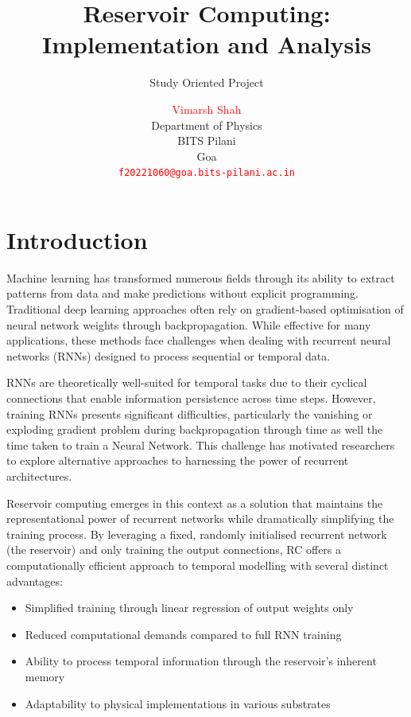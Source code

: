 \documentclass[numbered]{ivt-style/standard}
\title{Reservoir Computing: Implementation and Analysis}
\subtitle{Study Oriented Project}
\author{
  \textcolor{red}{Vimarsh Shah} \\
  Department of Physics \\
  BITS Pilani \\
  Goa \\
  \texttt{\textcolor{red}{f20221060@goa.bits-pilani.ac.in}}
}
\begin{document}
\maketitle
\clearpage

\tableofcontents


\newpage



\section{Introduction}

Machine learning has transformed numerous fields through its ability to extract patterns from data and make predictions without explicit programming. Traditional deep learning approaches often rely on gradient-based optimisation of neural network weights through backpropagation. While effective for many applications, these methods face challenges when dealing with recurrent neural networks (RNNs) designed to process sequential or temporal data.

RNNs are theoretically well-suited for temporal tasks due to their cyclical connections that enable information persistence across time steps. However, training RNNs presents significant difficulties, particularly the vanishing or exploding gradient problem during backpropagation through time as well the time taken to train a Neural Network. This challenge has motivated researchers to explore alternative approaches to harnessing the power of recurrent architectures.

Reservoir computing emerges in this context as a solution that maintains the representational power of recurrent networks while dramatically simplifying the training process. By leveraging a fixed, randomly initialised recurrent network (the reservoir) and only training the output connections, RC offers a computationally efficient approach to temporal modelling with several distinct advantages:

\begin{itemize}
    \item Simplified training through linear regression of output weights only
    \item Reduced computational demands compared to full RNN training
    \item Ability to process temporal information through the reservoir's inherent memory
    \item Adaptability to physical implementations in various substrates
\end{itemize}
\end{document}
